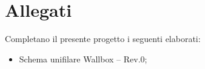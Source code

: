 \newpage
\pagestyle{fancy}

\section{Allegati}

Completano il presente progetto i seguenti elaborati:
\begin{itemize}
    \item Schema unifilare Wallbox – Rev.0;

\end{itemize}
